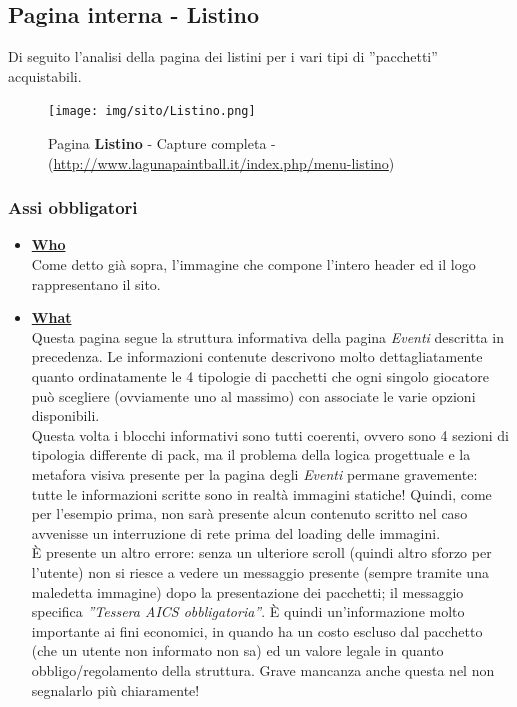\documentclass[../Relazione.tex]{subfiles}
\begin{document}
\newpage
    \subsection{Pagina interna - Listino}

    Di seguito l'analisi della pagina dei listini per i vari tipi di ''pacchetti'' acquistabili.
        \begin{figure}[!h]
            \centering
            \texttt{[image: img/sito/Listino.png]}
            \caption{Pagina \textbf{Listino} - Capture completa - (\url{http://www.lagunapaintball.it/index.php/menu-listino})}
        \end{figure}

    \subsubsection{Assi obbligatori}
        \vspace*{0,5cm}
        \begin{itemize}
            \item \textbf{\underline{Who}}
            \vspace*{5mm}\\Come detto già sopra, l'immagine che compone l'intero header ed il logo rappresentano il sito.
            \item \textbf{\underline{What}}
            \vspace*{5mm}\\Questa pagina segue la struttura informativa della pagina \emph{Eventi} descritta in precedenza. Le informazioni contenute descrivono molto dettagliatamente quanto ordinatamente le 4 tipologie di pacchetti che ogni singolo giocatore può scegliere (ovviamente uno al massimo) con associate le varie opzioni disponibili.\\
            Questa volta i blocchi informativi sono tutti coerenti, ovvero sono 4 sezioni di tipologia differente di pack, ma il problema della logica progettuale e la metafora visiva presente per la pagina degli \emph{Eventi} permane gravemente: tutte le informazioni scritte sono in realtà immagini statiche!
            Quindi, come per l'esempio prima, non sarà presente alcun contenuto scritto nel caso avvenisse un interruzione di rete prima del loading delle immagini.\\
            È presente un altro errore: senza un ulteriore scroll (quindi altro sforzo per l'utente) non si riesce a vedere un messaggio presente (sempre tramite una maledetta immagine) dopo la presentazione dei pacchetti; il messaggio specifica \emph{''Tessera AICS obbligatoria''}. È quindi un'informazione molto importante ai fini economici, in quando ha un costo escluso dal pacchetto (che un utente non informato non sa) ed un valore legale in quanto obbligo/regolamento della struttura.
            Grave mancanza anche questa nel non segnalarlo più chiaramente!
        \end{itemize}
\end{document}
